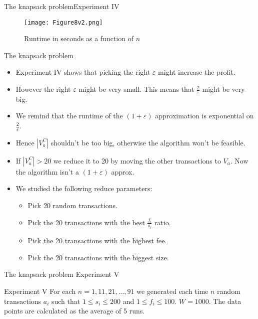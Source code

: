 \documentclass{beamer}
\begin{document}
\begin{frame}{The knapsack problem}{Experiment IV} %
    \begin{figure}
        \centering
        \texttt{[image: Figure8v2.png]}
        \caption{Runtime in seconds as a function of $n$}
    \end{figure}
\end{frame}
\begin{frame}{The knapsack problem} %
    \begin{itemize}
        \item {Experiment IV shows that picking the right $\varepsilon$ 
        might increase the profit.}
        \item {However the right $\varepsilon$ might be very small. This 
        means that $\frac{2}{\varepsilon}$ might be very big.}
        \item {We remind that the runtime of the $(1+\varepsilon)$ 
        approximation is exponential on $\frac{2}{\varepsilon}$.}
        \item {Hence $|V_a^C|$ shouldn't be too big, otherwise the algorithm
         won't be feasible.}
        \item {If $|V_a^C|>20$ we reduce it to 20 by moving the other 
        transactions to $V_a$. Now the algorithm isn't a $(1+\varepsilon)$ 
        approx.}
        \item {We studied the following reduce parameters:
            \begin{itemize}
                \item {Pick 20 random transactions.}
                \item {Pick the 20 transactions with the best $\frac{f_i}{s_i}$ 
                ratio.}
                \item{Pick the 20 transactions with the highest fee.}
                \item{Pick the 20 transactions with the biggest size.}
            \end{itemize}}
    \end{itemize}
\end{frame}
\begin{frame}{The knapsack problem }{Experiment V} %
    \begin{block}{Experiment V}
        For each $n=1,11,21,...,91$ we generated each time $n$ random 
        transactions $a_i$ such that $1\leq s_i\leq 200$ and 
        $1\leq f_i \leq 100$. $W=1000$. The data points are calculated as 
        the average of 5 runs.
    \end{block}
\end{frame}
\end{document}
